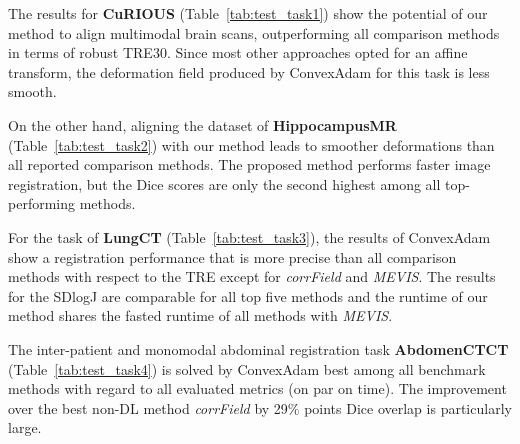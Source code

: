 The results for \textbf{CuRIOUS} (Table~\ref{tab:test_task1}) show the potential of our method to align multimodal brain scans, outperforming all comparison methods in terms of robust TRE30. Since most other approaches opted for an affine transform, the deformation field produced by ConvexAdam for this task is less smooth. %


On the other hand, aligning the dataset of \textbf{HippocampusMR}  (Table~\ref{tab:test_task2}) with our method leads to smoother deformations than all reported comparison methods. The proposed method performs faster image registration, but the Dice scores are only the second highest among all top-performing methods.

For the task of \textbf{LungCT} (Table~\ref{tab:test_task3}), the results of ConvexAdam show a registration performance that is more precise than all comparison methods with respect to the TRE except for \textit{corrField} and \textit{MEVIS}. The results for the SDlogJ are comparable for all top five methods and the runtime of our method shares the fasted runtime of all methods with \textit{MEVIS}.

The inter-patient and monomodal abdominal registration task \textbf{AbdomenCTCT} (Table~\ref{tab:test_task4}) is solved by ConvexAdam best among all benchmark methods with regard to all evaluated metrics (on par on time). The improvement over the best non-DL method \textit{corrField} by 29\% points Dice overlap is particularly large. 


